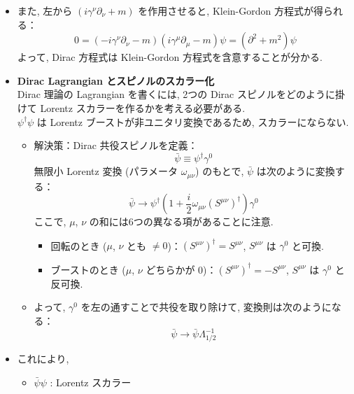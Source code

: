 \documentclass[a4paper,12pt]{article}
\begin{document}
\begin{itemize}
    \item また, 左から $(i \gamma^\nu \partial_\nu + m)$ を作用させると, Klein-Gordon 方程式が得られる：
    \begin{equation*}
    0 = (-i \gamma^\nu \partial_\nu - m)(i \gamma^\mu \partial_\mu - m)\psi
    = (\partial^2 + m^2)\psi
    \end{equation*}
    よって, Dirac 方程式は Klein-Gordon 方程式を含意することが分かる.
    \item \textbf{Dirac Lagrangian とスピノルのスカラー化}\\
    Dirac 理論の Lagrangian を書くには, 2つの Dirac スピノルをどのように掛けて Lorentz スカラーを作るかを考える必要がある.\\
    $\psi^\dagger \psi$ は Lorentz ブーストが非ユニタリ変換であるため, スカラーにならない.
    \begin{itemize}
    \item 解決策：Dirac 共役スピノルを定義：
    \begin{equation*}
    \bar{\psi} \equiv \psi^\dagger \gamma^0 \tag{3.32}
    \end{equation*}
    無限小 Lorentz 変換 (パラメータ $\omega_{\mu\nu}$) のもとで, $\bar{\psi}$ は次のように変換する：
     \begin{equation*}
        \bar{\psi} \rightarrow \psi^\dagger \left(1 + \frac{i}{2} \omega_{\mu\nu} (S^{\mu\nu})^\dagger \right) \gamma^0
     \end{equation*}
     ここで, $\mu$, $\nu$ の和には6つの異なる項があることに注意.
    \begin{itemize}
        \item 回転のとき ($\mu$, $\nu$ とも $\neq 0$)：$(S^{\mu\nu})^\dagger = S^{\mu\nu}$, $S^{\mu\nu}$ は $\gamma^0$ と可換.
        \item ブーストのとき ($\mu$, $\nu$ どちらかが $0$)：$(S^{\mu\nu})^\dagger = -S^{\mu\nu}$, $S^{\mu\nu}$ は $\gamma^0$ と反可換.
    \end{itemize}
    \item よって, $\gamma^0$ を左の通すことで共役を取り除けて, 変換則は次のようになる：
    \begin{equation*}
    \bar{\psi} \rightarrow \bar{\psi} \Lambda_{1/2}^{-1} \tag{3.33}
    \end{equation*}
    \end{itemize}
    \item これにより,
    \begin{itemize}
      \item $\bar{\psi} \psi$ : Lorentz スカラー

\end{itemize}
\end{itemize}
\end{document}
